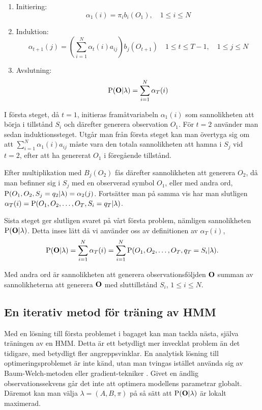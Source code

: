 \documentclass[../rapport_MVEX01-11-05]{subfiles}
\begin{document}
\begin{enumerate}
\item Initiering:
\begin{equation*}
\alpha_1(i) = \pi_ib_i(O_1), \quad 1\leq i \leq N
\end{equation*}

\item Induktion:
\begin{equation*}
\alpha_{t+1}(j) =
\left(\sum_{i=1}^N\alpha_t(i)a_{ij}\right)b_j(O_{t+1}) \quad 1 \leq t \leq T-1,\quad1 \leq j \leq N
\end{equation*}

\item Avslutning:
\begin{equation*}
\mathrm{P}(\mathbf{O}|\lambda) = \sum_{i=1}^N\alpha_T(i)
\end{equation*}
\end{enumerate}

I första steget, då $t=1$, initieras framåtvariabeln $\alpha_1(i)$ som
sannolikheten att börja i tillstånd $S_i$ och därefter generera
observation $O_1$. För $t=2$ använder man sedan induktionssteget. Utgår man
från första steget kan man övertyga sig om att
$\sum_{i=1}^N\alpha_1(i)a_{ij}$ måste vara den totala sannolikheten
att hamna i $S_j$ vid $t=2$, efter att ha genererat $O_1$ i föregående
tillstånd.

Efter multiplikation med $B_j(O_{2})$ fås därefter
sannolikheten att generera $O_2$, då man befinner sig i $S_j$ med en
observerad symbol $O_1$, eller med andra ord, $\mathrm{P}(O_1,O_2,S_j
= q_2 | \lambda) = \alpha_2(j)$. Fortsätter man på samma vis har man
slutligen $\alpha_T(i) = \mathrm{P}(O_1,O_2,\dots,O_T,S_i = q_T |
\lambda)$.

Sista steget ger slutligen svaret på vårt första problem, nämligen
sannolikheten $\mathrm{P}(\mathbf{O}|\lambda)$. Detta inses lätt då vi
använder oss av definitionen av $\alpha_T(i)$, 
\begin{equation*}
\mathrm{P}(\mathbf{O}|\lambda) = \sum_{i=1}^N\alpha_T(i) =
\sum_{i=1}^N\mathrm{P}(O_1,O_2,\dots,O_T,q_T = S_i|\lambda). 
\end{equation*} 

Med andra ord är sannolikheten att generera observationsföljden
$\mathbf{O}$ summan av sannolikheterna att generera $\mathbf{O}$ med
sluttillstånd $S_i$, $1 \leq i \leq N$.

\subsection{En iterativ metod för träning av HMM}
Med en lösning till första problemet i bagaget kan man tackla nästa,
själva träningen av en HMM. Detta är ett betydligt mer invecklat
problem än det tidigare, med betydligt fler angreppsvinklar. En
analytisk lösning till optimeringsproblemet är inte känd, utan man
tvingas istället använda sig av Baum-Welch-metoden eller
gradient-tekniker \cite{Dempster77,Levinson83}. 
Givet en ändlig observationssekvens går det inte att optimera
modellens parametrar globalt.
Däremot kan man välja $\lambda = (A,B,\pi)$ på så sätt att $\mathrm{P}(\mathbf{O}|\lambda)$ är lokalt
maximerad. 
\end{document}
